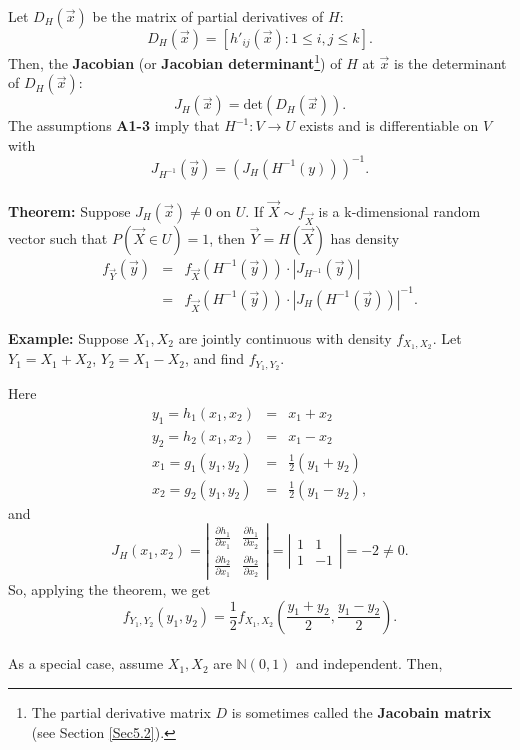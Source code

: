 \documentclass[12pt,oneside]{article}
\begin{document}
\noindent Let $D_H(\vec{x})$ be the matrix of partial derivatives of $H$:
\[D_H(\vec{x}) = [h'_{ij}(\vec{x}) : 1 \leq i,j \leq k] .\]
Then, the \textbf{Jacobian} (or \textbf{Jacobian determinant}\footnote{The partial derivative matrix $D$ is sometimes called the \textbf{Jacobain matrix} (see Section \ref{Sec5.2}).}) of $H$ at $\vec{x}$ is the determinant of $D_H(\vec{x})$: \[J_H(\vec{x}) = \mbox{det}(D_H(\vec{x})). \]
The assumptions \textbf{A1-3} imply that $H^{-1}: V \rightarrow U$ exists and is differentiable on $V$ with
\[J_{H^{-1}} (\vec{y}) = (J_H(H^{-1}(y)))^{-1}.\] \\

\noindent \textbf{Theorem:} Suppose $J_H(\vec{x}) \neq 0$ on $U$.  If $\vec{X} \sim f_{\vec{X}}$ is a k-dimensional random vector such that $P(\vec{X} \in U) = 1$, then $\vec{Y} = H(\vec{X})$ has density
\begin{eqnarray*}
f_{\vec{Y}}(\vec{y}) &=& f_{\vec{X}} (H^{-1}(\vec{y}))\cdot|J_{H^{-1}}(\vec{y})| \\ &=& f_{\vec{X}} (H^{-1}(\vec{y})) \cdot |J_H(H^{-1}(\vec{y}))|^{-1} .
\end{eqnarray*}

\noindent \textbf{Example:} Suppose $X_1,X_2$ are jointly continuous with density $f_{X_1,X_2}$.  Let $Y_1 = X_1+X_2$, $Y_2 = X_1-X_2$,  and find $f_{Y_1,Y_2}$.

Here \begin{eqnarray*} y_1 = h_1(x_1,x_2) &=& x_1+x_2 \\
			       y_2 = h_2(x_1,x_2) &=& x_1-x_2 \\
			       x_1 = g_1(y_1,y_2) &=& \frac{1}{2} (y_1+y_2) \\
			       x_2 = g_2(y_1,y_2) &=& \frac{1}{2} (y_1-y_2) , \end{eqnarray*}
and
\[J_H(x_1,x_2) = \left | \begin{array}{cc} \frac{\partial h_1}{\partial x_1} & \frac{\partial h_1}{\partial x_2} \\ \frac{\partial h_2}{\partial x_1} & \frac{\partial h_2}{\partial x_2} \end{array} \right |
		= \left | \begin{array}{cc} 1 & 1 \\ 1 & -1 \end{array} \right | = -2 \neq 0. \]
So, applying the theorem, we get
\[f_{Y_1,Y_2}(y_1,y_2) = \frac{1}{2} f_{X_1,X_2} (\frac{y_1+y_2}{2},\frac{y_1-y_2}{2}). \] \\

As a special case, assume $X_1,X_2$ are $\mathbb{N}(0,1)$ and independent.  Then,
\end{document}
